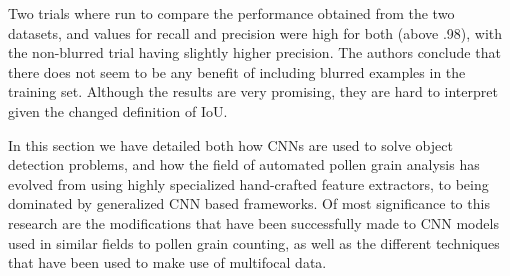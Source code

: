 Two trials where run to compare the performance obtained from the two datasets, and values for recall and precision were high for both (above .98), with the non-blurred trial having slightly higher precision.
The authors conclude that there does not seem to be any benefit of including blurred examples in the training set.
Although the results are very promising, they are hard to interpret given the changed definition of IoU.

In this section we have detailed both how CNNs are used to solve object detection problems, and how the field of automated pollen grain analysis has evolved from using highly specialized hand-crafted feature extractors, to being dominated by generalized CNN based frameworks.
Of most significance to this research are the modifications that have been successfully made to CNN models used in similar fields to pollen grain counting, as well as the different techniques that have been used to make use of multifocal data.

